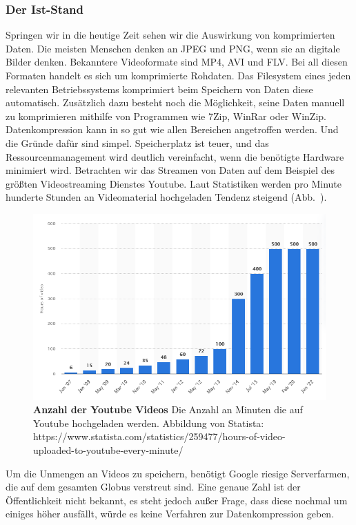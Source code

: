 \subsubsection*{Der Ist-Stand}
Springen wir in die heutige Zeit sehen wir die Auswirkung von komprimierten Daten.
Die meisten Menschen denken an JPEG und PNG, wenn sie an digitale Bilder denken.
Bekanntere Videoformate sind MP4, AVI und FLV.
Bei all diesen Formaten handelt es sich um komprimierte Rohdaten.
Das Filesystem eines jeden relevanten Betriebssystems komprimiert beim Speichern von Daten diese automatisch.
Zusätzlich dazu besteht noch die Möglichkeit, seine Daten manuell zu komprimieren mithilfe von Programmen wie 7Zip, WinRar oder WinZip.
Datenkompression kann in so gut wie allen Bereichen angetroffen werden.
Und die Gründe dafür sind simpel.
Speicherplatz ist teuer, und das Ressourcenmanagement wird deutlich vereinfacht, wenn die benötigte Hardware minimiert wird.
Betrachten wir das Streamen von Daten auf dem Beispiel des größten Videostreaming Dienstes Youtube.
Laut Statistiken werden pro Minute hunderte Stunden an Videomaterial hochgeladen Tendenz steigend (Abb.~).
\begin{figure}[htb]
  \centering  
  \includegraphics[scale=0.8]{Bilder/youtube_statistik.png}
  \caption[Youtube Statistik]{\textbf{Anzahl der Youtube Videos} Die Anzahl an Minuten die auf Youtube hochgeladen werden.
  Abbildung von Statista: https://www.statista.com/statistics/259477/hours-of-video-uploaded-to-youtube-every-minute/ }
  \label{fig:youtube}
\end{figure}
Um die Unmengen an Videos zu speichern, benötigt Google riesige Serverfarmen, die auf dem gesamten Globus verstreut sind.
Eine genaue Zahl ist der Öffentlichkeit nicht bekannt, es steht jedoch außer Frage, dass diese nochmal um einiges höher ausfällt, würde es keine Verfahren zur Datenkompression geben. \newline

